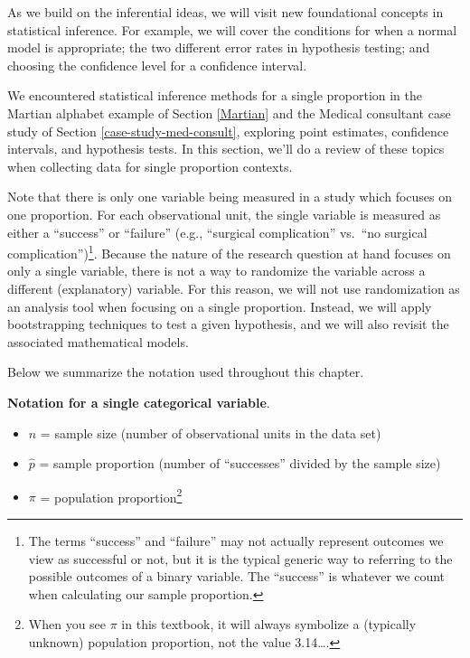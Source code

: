 \documentclass[
  10pt,
  openany]{book}
\providecommand{\tightlist}{%
  \setlength{\itemsep}{0pt}\setlength{\parskip}{0pt}}
\theoremstyle{definition}
\theoremstyle{definition}
\theoremstyle{definition}
\theoremstyle{definition}
\theoremstyle{remark}
\begin{document}
As we build on the inferential ideas, we will visit new foundational concepts in statistical inference.
For example, we will cover the conditions for when a normal model is appropriate; the two different error rates in hypothesis testing; and choosing the confidence level for a confidence interval.

We encountered statistical inference methods for a single proportion in the Martian alphabet example of Section \ref{Martian} and the Medical consultant case study of Section \ref{case-study-med-consult}, exploring point estimates, confidence intervals, and hypothesis tests.
In this section, we'll do a review of these topics when collecting data for single proportion contexts.

Note that there is only one variable being measured in a study which focuses on one proportion.
For each observational unit, the single variable is measured as either a ``success'' or ``failure'' (e.g., ``surgical complication'' vs.~``no surgical complication'')\footnote{The terms ``success'' and ``failure'' may not actually represent outcomes we view as successful or not, but it is the typical generic way to referring to the possible outcomes of a binary variable. The ``success'' is whatever we count when calculating our sample proportion.}.
Because the nature of the research question at hand focuses on only a single variable, there is not a way to randomize the variable across a different (explanatory) variable.
For this reason, we will not use randomization as an analysis tool when focusing on a single proportion.
Instead, we will apply bootstrapping techniques to test a given hypothesis, and we will also revisit the associated mathematical models.

Below we summarize the notation used throughout this chapter.

\textbf{Notation for a single categorical variable}.

\begin{itemize}
\tightlist
\item
  \(n\) = sample size (number of observational units in the data set)
\item
  \(\hat{p}\) = sample proportion (number of ``successes'' divided by the sample size)
\item
  \(\pi\) = population proportion\footnote{When you see \(\pi\) in this textbook, it will always symbolize a (typically unknown) population proportion, not the value 3.14\ldots.}
\end{itemize}
\end{document}
